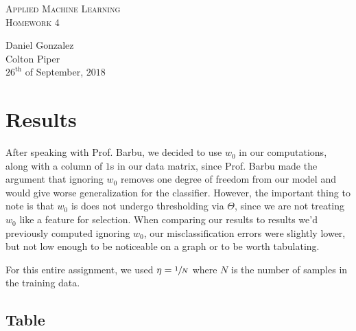 \documentclass[UTF8]{article}
\begin{document}
\begin{center}
	\textsc{\huge Applied Machine Learning}\\
	\textsc{\Large Homework 4}\\
\end{center}
\begin{flushright}
	Daniel Gonzalez\\
    Colton Piper\\
	$26^{\text{th}}$ of September, $2018$
\end{flushright}


\section{Results}
After speaking with Prof. Barbu, we decided to use $w_0$ in our computations, along with a column of $1$s in our data matrix,
since Prof. Barbu made the argument that ignoring $w_0$ removes one degree of freedom from our model and would give worse generalization for the classifier.
However, the important thing to note is that $w_0$ is does not undergo thresholding via $\Theta$, since we are not treating $w_0$ like a feature for selection.
When comparing our results to results we'd previously computed ignoring $w_0$, our misclassification errors were slightly lower,
but not low enough to be noticeable on a graph or to be worth tabulating.

For this entire assignment, we used $\eta = \sfrac{1}{N}$ where $N$ is the number of samples in the training data.

\subsection{Table}
\end{document}
